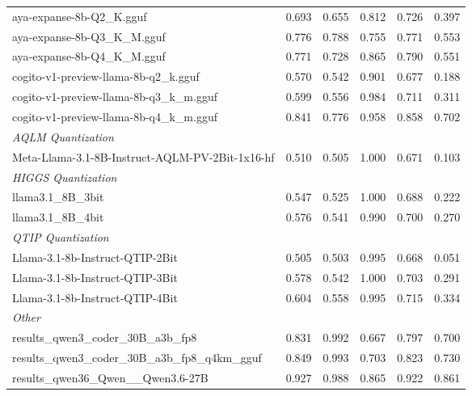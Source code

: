 \begin{table}[htbp]
{\begin{tabular}{lrrrrr}
    aya-expanse-8b-Q2\_K.gguf & 0.693 & 0.655 & 0.812 & 0.726 & 0.397 \\
    aya-expanse-8b-Q3\_K\_M.gguf & 0.776 & 0.788 & 0.755 & 0.771 & 0.553 \\
    aya-expanse-8b-Q4\_K\_M.gguf & 0.771 & 0.728 & 0.865 & 0.790 & 0.551 \\
    cogito-v1-preview-llama-8b-q2\_k.gguf & 0.570 & 0.542 & 0.901 & 0.677 & 0.188 \\
    cogito-v1-preview-llama-8b-q3\_k\_m.gguf & 0.599 & 0.556 & 0.984 & 0.711 & 0.311 \\
    cogito-v1-preview-llama-8b-q4\_k\_m.gguf & 0.841 & 0.776 & 0.958 & 0.858 & 0.702 \\
    \midrule
    \multicolumn{6}{l}{\textit{AQLM Quantization}} \\
    \midrule
    Meta-Llama-3.1-8B-Instruct-AQLM-PV-2Bit-1x16-hf & 0.510 & 0.505 & 1.000 & 0.671 & 0.103 \\
    \midrule
    \multicolumn{6}{l}{\textit{HIGGS Quantization}} \\
    \midrule
    llama3.1\_8B\_3bit & 0.547 & 0.525 & 1.000 & 0.688 & 0.222 \\
    llama3.1\_8B\_4bit & 0.576 & 0.541 & 0.990 & 0.700 & 0.270 \\
    \midrule
    \multicolumn{6}{l}{\textit{QTIP Quantization}} \\
    \midrule
    Llama-3.1-8b-Instruct-QTIP-2Bit & 0.505 & 0.503 & 0.995 & 0.668 & 0.051 \\
    Llama-3.1-8b-Instruct-QTIP-3Bit & 0.578 & 0.542 & 1.000 & 0.703 & 0.291 \\
    Llama-3.1-8b-Instruct-QTIP-4Bit & 0.604 & 0.558 & 0.995 & 0.715 & 0.334 \\
    \midrule
    \multicolumn{6}{l}{\textit{Other}} \\
    \midrule
    results\_qwen3\_coder\_30B\_a3b\_fp8 & 0.831 & 0.992 & 0.667 & 0.797 & 0.700 \\
    results\_qwen3\_coder\_30B\_a3b\_fp8\_q4km\_gguf & 0.849 & 0.993 & 0.703 & 0.823 & 0.730 \\
    results\_qwen36\_Qwen\_\_Qwen3.6-27B & 0.927 & 0.988 & 0.865 & 0.922 & 0.861 \\
    \bottomrule
  \end{tabular}
  }
\end{table}

